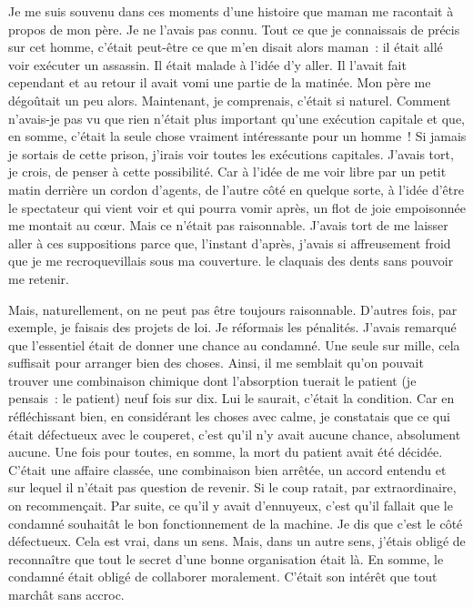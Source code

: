 \documentclass[french,twoside]{book} %
\begin{document}
Je me suis souvenu dans ces moments d’une histoire que maman me racontait à propos de mon père. Je ne l’avais pas connu. Tout ce que je connaissais de précis sur cet homme, c’était peut-être ce que m’en disait alors maman : il était allé voir exécuter un assassin. Il était malade à l’idée d’y aller. Il l’avait fait cependant et au retour il avait vomi une partie de la matinée. Mon père me dégoûtait un peu alors. Maintenant, je comprenais, c’était si naturel. Comment n’avais-je pas vu que rien n’était plus important qu’une exécution capitale et que, en somme, c’était la seule chose vraiment intéressante pour un homme ! Si jamais je sortais de cette prison, j’irais voir toutes les exécutions capitales. J'avais tort, je crois, de penser à cette possibilité. Car à l’idée de me voir libre par un petit matin derrière un cordon d’agents, de l’autre côté en quelque sorte, à l’idée d’être le spectateur qui vient voir et qui pourra vomir après, un flot de joie empoisonnée me montait au cœur. Mais ce n’était pas raisonnable. J'avais tort de me laisser aller à ces suppositions parce que, l’instant d’après, j’avais si affreusement froid que je me recroquevillais sous ma couverture. le claquais des dents sans pouvoir me retenir.\par
Mais, naturellement, on ne peut pas être toujours raisonnable. D'autres fois, par exemple, je faisais des projets de loi. Je réformais les pénalités. J'avais remarqué que l’essentiel était de donner une chance au condamné. Une seule sur mille, cela suffisait pour arranger bien des choses. Ainsi, il me semblait qu’on pouvait trouver une combinaison chimique dont l’absorption tuerait le patient (je pensais : le patient) neuf fois sur dix. Lui le saurait, c’était la condition. Car en réfléchissant bien, en considérant les choses avec calme, je constatais que ce qui était défectueux avec le couperet, c’est qu’il n’y avait aucune chance, absolument aucune. Une fois pour toutes, en somme, la mort du patient avait été décidée. C'était une affaire classée, une combinaison bien arrêtée, un accord entendu et sur lequel il n’était pas question de revenir. Si le coup ratait, par extraordinaire, on recommençait. Par suite, ce qu’il y avait d’ennuyeux, c’est qu’il fallait que le condamné souhaitât le bon fonctionnement de la machine. Je dis que c’est le côté défectueux. Cela est vrai, dans un sens. Mais, dans un autre sens, j’étais obligé de reconnaître que tout le secret d’une bonne organisation était là. En somme, le condamné était obligé de collaborer moralement. C'était son intérêt que tout marchât sans accroc.\par
\end{document}
